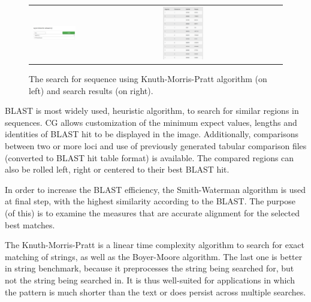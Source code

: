 \documentclass[a4paper]{spie}
\newcommand{\appShortcut}{CG}
\begin{document}
\begin{figure}[htp]
  \centering
  \begin{tabular}{ll}
    \includegraphics[width=0.35\textwidth]{img/search.png}
    &
    \includegraphics[width=0.35\textwidth]{img/search_results.png}
  \end{tabular}
  \caption{The search for sequence using Knuth-Morris-Pratt algorithm (on left) and search results (on right).}
  \label{fig:search}
\end{figure}

BLAST is most widely used, heuristic algorithm, to search for similar regions in sequences.
\appShortcut{} allows customization of the minimum expect values, lengths and identities of BLAST hit to be displayed in the image.
Additionally, comparisons between two or more loci and use of previously generated tabular comparison files (converted to BLAST hit table format) is available.
The compared regions can also be rolled left, right or centered to their best BLAST hit.

In order to increase the BLAST efficiency, the Smith-Waterman algorithm is used at final step, with the highest similarity according to the BLAST.
The purpose (of this) is to examine the measures that are accurate alignment for the selected best matches.

The Knuth-Morris-Pratt is a linear time complexity algorithm to search for exact matching of strings, as well as the Boyer-Moore algorithm.
The last one is better in string benchmark, because it preprocesses the string being searched for, but not the string being searched in.
It is thus well-suited for applications in which the pattern is much shorter than the text or does persist across multiple searches.
\end{document}
